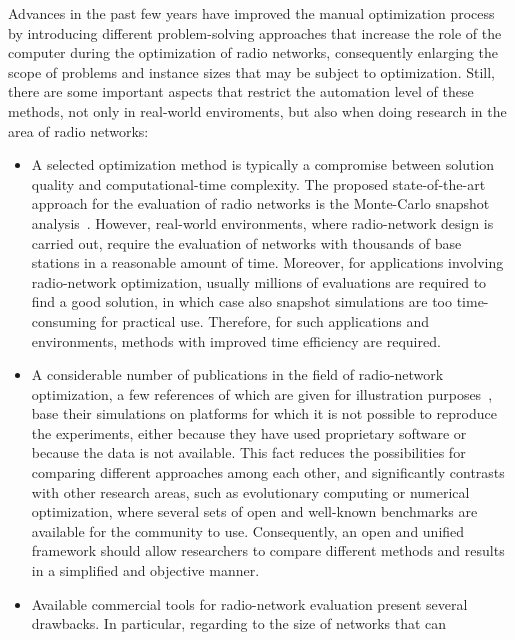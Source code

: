 Advances in the past few years have improved the manual optimization
process by introducing different problem-solving approaches that increase
the role of the computer during the optimization of radio networks,
consequently enlarging the scope of problems and instance sizes that
may be subject to optimization. Still, there are some important aspects
that restrict the automation level of these methods, not only in real-world
enviroments, but also when doing research in the area of radio networks:
\begin{itemize}
\item A selected optimization method is typically a compromise between solution
quality and computational-time complexity. The proposed state-of-the-art
approach for the evaluation of radio networks is the Monte-Carlo snapshot
analysis~\cite{Turke-Efficient_methods_for_WCDMA_radio_network_planning_and_optimization:2007,Wacker-Static_simulator_for_studying_WCDMA_radio_network_planning;1999}.
However, real-world environments, where radio-network design is carried
out, require the evaluation of networks with thousands of base stations
in a reasonable amount of time. Moreover, for applications involving
radio-network optimization, usually millions of evaluations are required
to find a good solution, in which case also snapshot simulations are
too time-consuming for practical use. Therefore, for such applications
and environments, methods with improved time efficiency are required.
\item A considerable number of publications in the field of radio-network
optimization, a few references of which are given for illustration
purposes~\cite{amaldi2007radio_planning,chen2008automated,chen2009fast,gordejuela2009two,siomina2008enhancing,siomina2007minimum_pilot_power},
base their simulations on platforms for which it is not possible to
reproduce the experiments, either because they have used proprietary
software or because the data is not available. This fact reduces the
possibilities for comparing different approaches among each other,
and significantly contrasts with other research areas, such as evolutionary
computing or numerical optimization, where several sets of open and
well-known benchmarks are available for the community to use. Consequently,
an open and unified framework should allow researchers to compare
different methods and results in a simplified and objective manner.
\item Available commercial tools for radio-network evaluation present several
drawbacks. In particular, regarding to the size of networks that can

\end{itemize}
